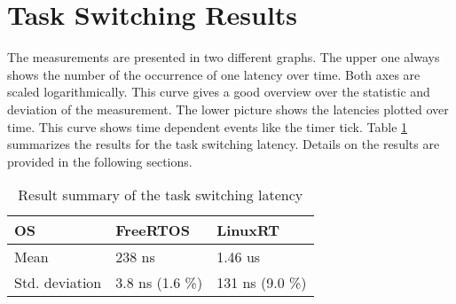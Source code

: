 \section{Task Switching Results}\label{s_task_switching_results}
The measurements are presented in two different graphs. 
The upper one always shows the number of the occurrence of one latency over time. 
Both axes are scaled logarithmically. 
This curve gives a good overview over the statistic and deviation of the measurement.
The lower picture shows the latencies plotted over time. 
This curve shows time dependent events like the timer tick.  
Table \ref{tab_summary_task_switching} summarizes the results for the task switching latency.
Details on the results are provided in the following sections.

\begin{table}[htbp]
	\centering
		\begin{tabular}{|l||l|l|}
			\hline
				OS 											& FreeRTOS	& LinuxRT  \\
				\hline 
				Mean  										& 238 ns		& 1.46 us  \\
			  \hline
			  Std. deviation 	  & 3.8 ns (1.6 \%)		& 131 ns (9.0 \%)		  \\
			\hline
		\end{tabular}
	\caption{Result summary of the task switching latency}
	\label{tab_summary_task_switching}
\end{table}

